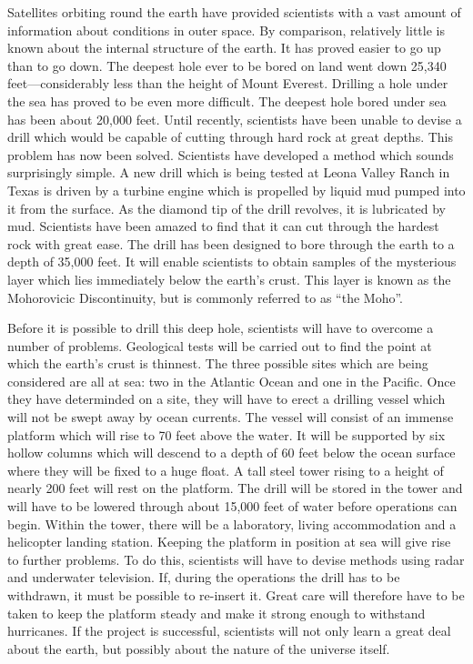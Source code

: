 \documentclass[11pt]{article}
\begin{document}
Satellites orbiting round the earth have provided scientists with a vast amount of information about conditions in outer space. By comparison, relatively little is known about the internal structure of the earth. It has proved easier to go up than to go down. The deepest hole ever to be bored on land went down 25,340 feet---considerably less than the height of Mount Everest. Drilling a hole under the sea has proved to be even more difficult. The deepest hole bored under sea has been about 20,000 feet. Until recently, scientists have been unable to devise a drill which would be capable of cutting through hard rock at great depths. This problem has now been solved. Scientists have developed a method which sounds surprisingly simple. A new drill which is being tested at Leona Valley Ranch in Texas is driven by a turbine engine which is propelled by liquid mud pumped into it from the surface. As the diamond tip of the drill revolves, it is lubricated by mud. Scientists have been amazed to find that it can cut through the hardest rock with great ease. The drill has been designed to bore through the earth to a depth of 35,000 feet. It will enable scientists to obtain samples of the mysterious layer which lies immediately below the earth's crust. This layer is known as the Mohorovicic Discontinuity, but is commonly referred to as ``the Moho''.

Before it is possible to drill this deep hole, scientists will have to overcome a number of problems. Geological tests will be carried out to find the point at which the earth's crust is thinnest. The three possible sites which are being considered are all at sea: two in the Atlantic Ocean and one in the Pacific. Once they have determinded on a site, they will have to erect a drilling vessel which will not be swept away by ocean currents. The vessel will consist of an immense platform which will rise to 70 feet above the water. It will be supported by six hollow columns which will descend to a depth of 60 feet below the ocean surface where they will be fixed to a huge float. A tall steel tower rising to a height of nearly 200 feet will rest on the platform. The drill will be stored in the tower and will have to be lowered through about 15,000 feet of water before operations can begin. Within the tower, there will be a laboratory, living accommodation and a helicopter landing station. Keeping the platform in position at sea will give rise to further problems. To do this, scientists will have to devise methods using radar and underwater television. If, during the operations the drill has to be withdrawn, it must be possible to re-insert it. Great care will therefore have to be taken to keep the platform steady and make it strong enough to withstand hurricanes. If the project is successful, scientists will not only learn a great deal about the earth, but possibly about the nature of the universe itself. 
\end{document}
